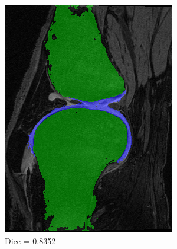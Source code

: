 \documentclass[a4paper,12pt]{article}
\begin{document}
\begin{figure}[H]
\begin{subfigure}[b]{0.32\linewidth}
    \includegraphics[width=\linewidth]{final_SPEP_median.png}
    \caption{Dice = 0.8352}
    \end{subfigure}
    \begin{subfigure}[b]{0.32\linewidth}

\end{subfigure}
\end{figure}
\end{document}
